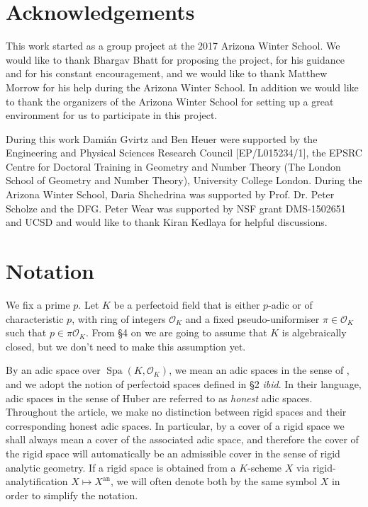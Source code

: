 \documentclass[10pt,oneside]{amsart}
\theoremstyle{definition}
\begin{document}
 \section*{Acknowledgements}
 This work started as a group project at the 2017 Arizona Winter School. We would like to thank Bhargav Bhatt for proposing the project, for his guidance and for his constant encouragement, and we would like to thank Matthew Morrow for his help during the Arizona Winter School. In addition we would like to thank the organizers of the Arizona Winter School for setting up a great environment for us to participate in this project. 
 
 During this work Dami\'an Gvirtz and Ben Heuer were supported by the Engineering and Physical Sciences Research Council [EP/L015234/1], the EPSRC Centre for Doctoral Training in Geometry and Number Theory (The London School of Geometry and Number Theory), University College London. 
 During the Arizona Winter School, Daria Shchedrina was supported by Prof. Dr. Peter Scholze and the DFG.
 Peter Wear was supported by NSF grant DMS-1502651 and UCSD and would like to thank Kiran Kedlaya for helpful discussions.


\section*{Notation}
	We fix a prime $p$.  Let $K$ be a perfectoid field that is either $p$-adic or of characteristic $p$, with ring of integers  $\mathcal O_K$ and  a fixed pseudo-uniformiser $\pi\in \mathcal O_K$ such that $p\in\pi\mathcal O_K$.
	From \S4 on we are going to assume that $K$ is algebraically closed, but we don't need to make this assumption yet.
	
	By an adic space over $\operatorname{Spa}(K,\mathcal O_K)$, we mean an adic spaces in the sense of \cite{SW}, and we adopt the notion of perfectoid spaces defined in \S2 \textit{\small ibid}. In their language, adic spaces in the sense of Huber are referred to as \textit{honest} adic spaces. Throughout the article, we make no distinction between rigid spaces and their corresponding honest adic spaces.
	In particular, by a cover of a rigid space we shall always mean a cover of the associated adic space, and therefore the cover of the rigid space will automatically be an admissible cover in the sense of rigid analytic geometry. 
	If a rigid space is obtained from a $K$-scheme $X$ via rigid-analytification $X\mapsto X^{\operatorname{an}}$, we will often denote both by the same symbol $X$ in order to simplify the notation.
	
\end{document}
